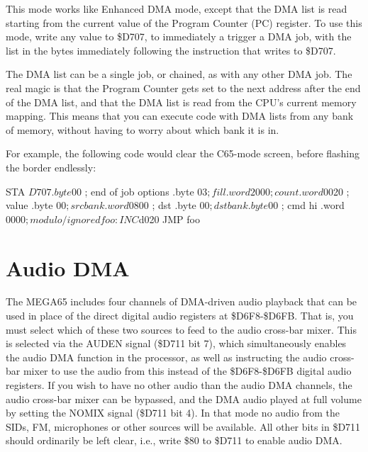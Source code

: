 This mode works like Enhanced DMA mode, except that the DMA list is read starting from the current value of the
Program Counter (PC) register.  To use this mode, write any value to \$D707, to immediately a trigger a DMA job,
with the list in the bytes immediately following the instruction that writes to \$D707.

The DMA list can be a single job, or chained, as with any other DMA job. The
real magic is that the Program Counter gets set to the next address after the end of the DMA list, and that
the DMA list is read from the CPU's current memory mapping. This means that you can execute code with DMA lists
from any bank of memory, without having to worry about which bank it is in.

For example, the following code would clear the C65-mode screen, before flashing the border endlessly:

\begin{screenoutput}
        STA $D707
        .byte $00   ; end of job options
        .byte $03   ; fill
        .word 2000  ; count
        .word $0020 ; value
        .byte $00   ; src bank
        .word $0800 ; dst
        .byte $00   ; dst bank
        .byte $00   ; cmd hi
        .word $0000 ; modulo / ignored
foo:
        INC $d020
        JMP foo
\end{screenoutput}

\section{Audio DMA}
The MEGA65 includes four channels of DMA-driven audio playback that can be used in place of the direct digital
audio registers at \$D6F8-\$D6FB.  That is, you must select which of these two sources to feed to the audio
cross-bar mixer.  This is selected via the AUDEN signal (\$D711 bit 7), which simultaneously enables the audio DMA
function in the processor, as well as instructing the audio cross-bar mixer to use the audio from this instead
of the \$D6F8-\$D6FB digital audio registers. If you wish to have no
other audio than the audio DMA channels, the audio cross-bar mixer can
be bypassed, and the DMA audio played at full volume by setting the
NOMIX signal (\$D711 bit 4).  In that mode no audio from the SIDs, FM,
microphones or other sources will be available.
All other bits in
\$D711 should ordinarily be left clear, i.e., write \$80 to \$D711 to
enable audio DMA.

